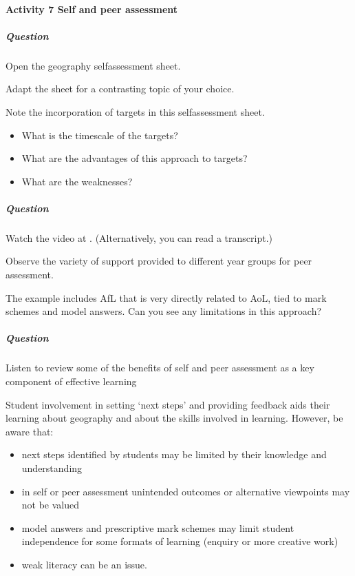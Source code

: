\documentclass[letterpaper,10pt,english]{sphinxmanual}
\begin{document}
\paragraph{Activity 7 Self and peer assessment}
\label{\detokenize{content/session_00/Part_00_03:Activity-7-Self-and-peer-assessment}}


\subparagraph{Question}
\label{\detokenize{content/session_00/Part_00_03:id3}}
Open the geography self\sphinxhyphen{}assessment sheet.

Adapt the sheet for a contrasting topic of your choice.

Note the incorporation of targets in this self\sphinxhyphen{}assessment sheet.
\begin{itemize}
\item {} 
What is the timescale of the targets?

\item {} 
What are the advantages of this approach to targets?

\item {} 
What are the weaknesses?

\end{itemize}


\subparagraph{Question}
\label{\detokenize{content/session_00/Part_00_03:id4}}\label{\detokenize{content/session_00/Part_00_03:id5}}
Watch the video at . (Alternatively, you can read a transcript.)

Observe the variety of support provided to different year groups for peer assessment.

The example includes AfL that is very directly related to AoL, tied to mark schemes and model answers. Can you see any limitations in this approach?


\subparagraph{Question}
\label{\detokenize{content/session_00/Part_00_03:question-2}}\label{\detokenize{content/session_00/Part_00_03:id6}}
Listen to  review some of the benefits of self and peer assessment as a key component of effective learning

Student involvement in setting ‘next steps’ and providing feedback aids their learning about geography and about the skills involved in learning. However, be aware that:
\begin{itemize}
\item {} 
next steps identified by students may be limited by their knowledge and understanding

\item {} 
in self or peer assessment unintended outcomes or alternative viewpoints may not be valued

\item {} 
model answers and prescriptive mark schemes may limit student independence for some formats of learning (enquiry or more creative work)

\item {} 
weak literacy can be an issue.

\end{itemize}
\end{document}
